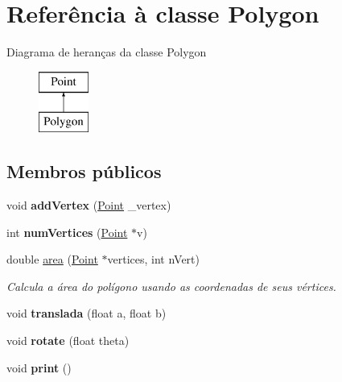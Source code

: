 \hypertarget{class_polygon}{}\section{Referência à classe Polygon}
\label{class_polygon}
Diagrama de heranças da classe Polygon\begin{figure}[H]
\begin{center}
\leavevmode
\includegraphics[height=2.000000cm]{class_polygon}
\end{center}
\end{figure}
\subsection*{Membros públicos}
\begin{DoxyCompactItemize}
\item 
\mbox{\label{class_polygon_a1ef47b98e579dd5e53744980fb822ab2}} 
void {\bfseries add\+Vertex} (\hyperlink{class_point}{Point} \+\_\+vertex)
\item 
\mbox{\label{class_polygon_aab9e9609b0ec0991f0be9099f4d48673}} 
int {\bfseries num\+Vertices} (\hyperlink{class_point}{Point} $\ast$v)
\item 
double \hyperlink{class_polygon_a1605b702a19992a4631aa1011092c0c1}{area} (\hyperlink{class_point}{Point} $\ast$vertices, int n\+Vert)
\begin{DoxyCompactList}\small\item\em Calcula a área do polígono usando as coordenadas de seus vértices. \end{DoxyCompactList}\item 
\mbox{\label{class_polygon_a082ff056dc124290a464b0b718212d02}} 
void {\bfseries translada} (float a, float b)
\item 
\mbox{\label{class_polygon_a7f7ef8b0f44d5d063989f777c6afdbe9}} 
void {\bfseries rotate} (float theta)
\item 
\mbox{\label{class_polygon_a60830487fc3c6b815aa577e9dd758b51}} 
void {\bfseries print} ()
\end{DoxyCompactItemize}


